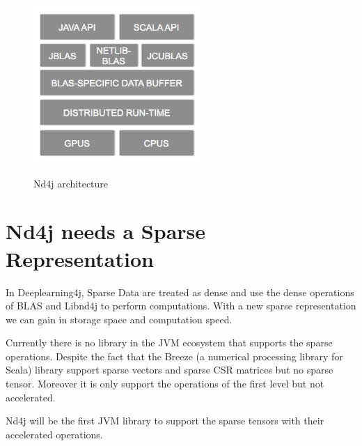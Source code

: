 \begin{figure}[h]
	\begin{center}
		\includegraphics[width=2.5in]{images/nd4j_architecture.png} 
		\label{fig:hierachy}
		\caption{Nd4j architecture}
	\end{center}
\end{figure}

\section{Nd4j needs a Sparse Representation}

In Deeplearning4j, Sparse Data are treated as dense and use the dense operations of BLAS and Libnd4j to perform computations. With a new sparse representation we can gain in storage space and computation speed.

Currently there is no library in the JVM ecosystem that supports the sparse operations. Despite the fact that the Breeze (a numerical processing library for Scala) library \cite{breeze} support sparse vectors and sparse CSR matrices but no sparse tensor. Moreover it is only support the operations of the first level but not accelerated. 

Nd4j will be the first JVM library to support the sparse tensors with their accelerated operations.

